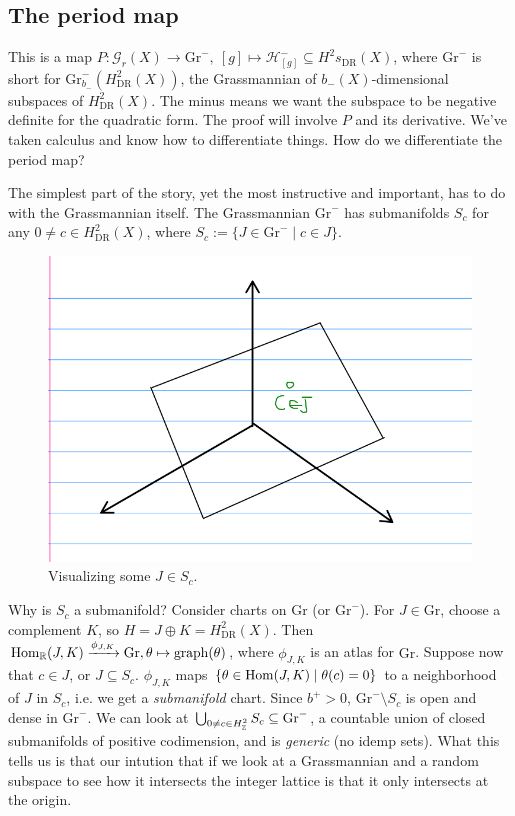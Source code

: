 \subsection{The period map}
This is a map $P \colon \mathcal G_r(X) \to \mathrm{Gr}^-, \ [g] \mapsto  \mathcal H^- _{[g]} \subseteq H^2s_{\mathrm{DR}}(X)$, where $\mathrm{Gr}^-$ is short for $\mathrm{Gr}^-_{b_-}\left(H^2 _{\mathrm{DR}}(X)\right)$, the Grassmannian of $b_-(X)$-dimensional subspaces of $H^2_{\mathrm{DR}}(X)$. The minus means we want the subspace to be negative definite for the quadratic form. The proof will involve $P$ and its derivative.
We've taken calculus and know how to differentiate things. How do we differentiate the period map?

The simplest part of the story, yet the most instructive and important, has to do with the Grassmannian itself. The Grassmannian $\mathrm{Gr}^-$ has submanifolds $S_{c}$ for any $0\neq c \in H^2_{\mathrm{DR}}(X)$, where $S_c := \{J \in \mathrm{Gr}^- \mid c \in J\}$.

\begin{figure}[H]
\centering
 \includegraphics[width=0.3\linewidth]{figures/grass.png}
\caption{Visualizing some $J \in S_c$.}
\label{grass}
\end{figure}
Why is $S_c$ a submanifold? Consider charts on $\mathrm{Gr}$ (or $\mathrm{Gr}^-$). For $J \in \mathrm{Gr}$, choose a complement $K$, so $H = J \oplus K = H^2 _{\mathrm{DR}}(X)$. Then $\operatorname{Hom} _{\mathbb{R}}(J,K) \xrightarrow{\phi _{J,K}} \mathrm{Gr}, \theta \mapsto  \mathrm{graph}(\theta)$, where $\phi _{J,K}$ is an atlas for $\mathrm{Gr}$. Suppose now that $c \in J$, or $J \subseteq S_c$. $\phi _{J,K}$ maps $\{\theta \in \operatorname{Hom}(J,K) \mid \theta(c) = 0\} $ to a neighborhood of $J$ in $S_c$, i.e. we get a \emph{submanifold} chart. Since $b^+ > 0$, $\mathrm{Gr}^- \setminus S_c$ is open and dense in $\mathrm{Gr}^-$. We can look at $\bigcup_{0\neq c \in H^2_{\mathbb{Z}}} S_c \subseteq \mathrm{Gr}^-$, a countable union of closed submanifolds of positive codimension, and is \emph{generic}  (no idemp sets). What this tells us is that our intution that if we look at a Grassmannian and a random subspace to see how it intersects the integer lattice is that it only intersects at the origin. 

